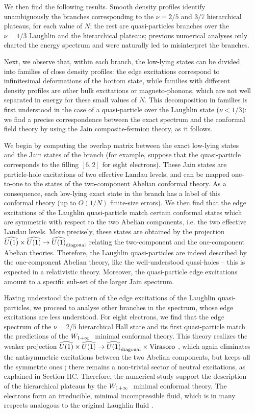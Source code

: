 We then find the following results.
Smooth density profiles identify unambiguously the branches 
corresponding to the $\nu=2/5$ and $ 3/7$ hierarchical plateaus,
for each value of $N$; the rest are quasi-particles branches
over the $\nu=1/3$ Laughlin and the hierarchical plateaus; 
previous numerical analyses \cite{wen}\cite{deja}\cite{kaap}
only charted the energy spectrum and were
naturally led to misinterpret the branches.

Next, we observe that, within each branch, the low-lying states can be 
divided into families of close density profiles: the edge excitations
correspond to infinitesimal deformations of the bottom state,
while families with different density profiles are other bulk 
excitations or magneto-phonons, which are not well separated in
energy for these small values of $N$.
This decomposition in families is first understood in the case
of a quasi-particle over the Laughlin state ($\nu < 1/3$): 
we find a precise correspondence between the exact spectrum 
and the conformal field
theory by using the Jain composite-fermion theory, as it follows.

We begin by computing the overlap matrix between the exact 
low-lying states and the Jain states of the branch (for
example, suppose that the quasi-particle corresponds to the filling 
$[6,2]$ for eight electrons).
These Jain states are particle-hole excitations of two effective Landau 
levels, and can be mapped one-to-one
to the states of the two-component Abelian conformal theory. 
As a consequence, each low-lying exact state in the branch 
has a label of this conformal theory (up to $O(1/N)$ finite-size errors). 
We then find that the edge excitations of the Laughlin quasi-particle
match certain conformal states which are
symmetric with respect to the two Abelian components, i.e. the
two effective Landau levels. 
More precisely, these states are obtained by the projection 
$\u1\times\u1 \to \u1_{\rm diagonal}$ relating the
two-component and the one-component Abelian theories.
Therefore, the Laughlin quasi-particles are indeed
described by the one-component Abelian theory, 
like the well-understood quasi-holes -- 
this is expected in a relativistic theory.
Moreover, the quasi-particle edge excitations amount 
to a specific sub-set of the larger Jain spectrum.

Having understood the pattern of the edge excitations of the 
Laughlin quasi-particles, we proceed to analyse other branches in the
spectrum, whose edge excitations are less understood.
For eight electrons, we find that the edge spectrum of 
the $\nu=2/5$ hierarchical Hall state and its first quasi-particle match the 
predictions of the $W_{1+\infty}\ $ minimal conformal theory.
This theory realizes the weaker projection
$\u1\times\u1 \to \u1_{\rm diagonal}\times {\rm Virasoro}$ \cite{ctz5}, 
which again eliminates the antisymmetric excitations between the 
two Abelian components, but keeps all the symmetric ones \cite{cz};
there remains a non-trivial sector of neutral excitations,
as explained in Section IIC. 
Therefore, the numerical study support the description of the
hierarchical plateaus by the $W_{1+\infty}\ $ minimal conformal theory.
The electrons form an irreducible, minimal incompressible fluid,
which is in many respects analogous to the original Laughlin fluid
\cite{laugh}.

